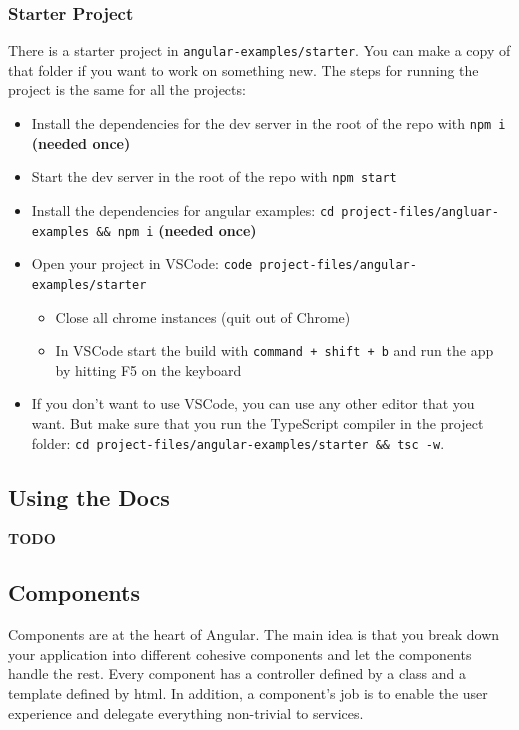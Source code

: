 \documentclass[12pt,]{article}
\providecommand{\tightlist}{%
  \setlength{\itemsep}{0pt}\setlength{\parskip}{0pt}}
\begin{document}
\subsubsection{Starter Project}\label{starter-project}

There is a starter project in \texttt{angular-examples/starter}. You can
make a copy of that folder if you want to work on something new. The
steps for running the project is the same for all the projects:

\begin{itemize}
\tightlist
\item
  Install the dependencies for the dev server in the root of the repo
  with \texttt{npm\ i} \textbf{(needed once)}
\item
  Start the dev server in the root of the repo with \texttt{npm\ start}
\item
  Install the dependencies for angular examples:
  \texttt{cd\ project-files/angluar-examples\ \&\&\ npm\ i}
  \textbf{(needed once)}
\item
  Open your project in VSCode:
  \texttt{code\ project-files/angular-examples/starter}

  \begin{itemize}
  \tightlist
  \item
    Close all chrome instances (quit out of Chrome)
  \item
    In VSCode start the build with \texttt{command\ +\ shift\ +\ b} and
    run the app by hitting F5 on the keyboard
  \end{itemize}
\item
  If you don't want to use VSCode, you can use any other editor that you
  want. But make sure that you run the TypeScript compiler in the
  project folder:
  \texttt{cd\ project-files/angular-examples/starter\ \&\&\ tsc\ -w}.
\end{itemize}

\subsection{Using the Docs}\label{using-the-docs}

\textbf{TODO}

\subsection{Components}\label{components}

Components are at the heart of Angular. The main idea is that you break
down your application into different cohesive components and let the
components handle the rest. Every component has a controller defined by
a class and a template defined by html. In addition, a component's job
is to enable the user experience and delegate everything non-trivial to
services.
\end{document}
